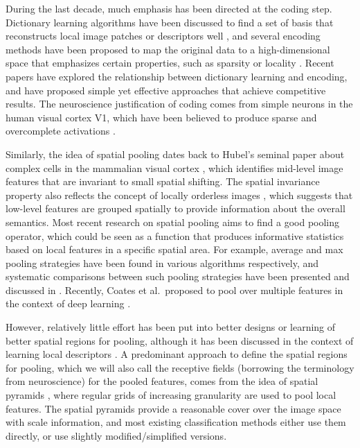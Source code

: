 During the last decade, much emphasis has been directed at the coding step. Dictionary learning algorithms have been discussed to find a set of basis that reconstructs local image patches or descriptors well \cite{mairal2010online,coates2011icml}, and several encoding methods have been proposed to map the original data to a high-dimensional space that emphasizes certain properties, such as sparsity \cite{Olshausen:1997uh,Yang:2009vb,yang2010efficient} or locality \cite{wang2010locality}. Recent papers \cite{coates2010aistats, Rigamonti:2011uc, coates2011icml} have explored the relationship between dictionary learning and encoding, and have proposed simple yet effective approaches that achieve competitive results. The neuroscience justification of coding comes from simple neurons in the human visual cortex V1, which have been believed to produce sparse and overcomplete activations \cite{Olshausen:1997uh}.

Similarly, the idea of spatial pooling dates back to Hubel's seminal paper about complex cells in the mammalian visual cortex \cite{Hubel:1962vm}, which identifies mid-level image features that are invariant to small spatial shifting. The spatial invariance property also reflects the concept of locally orderless images \cite{Koenderink:1999bh}, which suggests that low-level features are grouped spatially to provide information about the overall semantics. Most recent research on spatial pooling aims to find a good pooling operator, which could be seen as a function that produces informative statistics based on local features in a specific spatial area. For example, average and max pooling strategies have been found in various algorithms respectively, and systematic comparisons between such pooling strategies have been presented and discussed in \cite{Boureau:uq,Boureau:2010wz}. Recently, Coates et al.\ proposed to pool over multiple features in the context of deep learning \cite{coates2011selecting}.

However, relatively little effort has been put into better designs or learning of better spatial regions for pooling, although it has been discussed in the context of learning local descriptors \cite{winder2007learning}. A predominant approach to define the spatial regions for pooling, which we will also call the receptive fields (borrowing the terminology from neuroscience) for the pooled features, comes from the idea of spatial pyramids \cite{lazebnik2006beyond, Yang:2009vb}, where regular grids of increasing granularity are used to pool local features. The spatial pyramids provide a reasonable cover over the image space with scale information, and most existing classification methods either use them directly, or use slightly modified/simplified versions.

